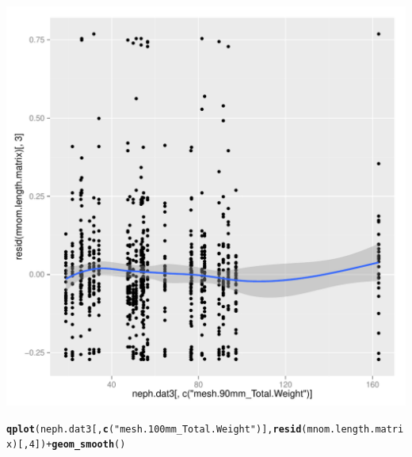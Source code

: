 \documentclass[12pt]{article}\usepackage[]{graphicx}\usepackage[]{color}
\makeatletter
\def\maxwidth{ %
  \ifdim\Gin@nat@width>\linewidth
    \linewidth
  \else
    \Gin@nat@width
  \fi
}
\newcommand{\hlnum}[1]{\textcolor[rgb]{0.686,0.059,0.569}{#1}}%
\newcommand{\hlstr}[1]{\textcolor[rgb]{0.192,0.494,0.8}{#1}}%
\newcommand{\hlopt}[1]{\textcolor[rgb]{0,0,0}{#1}}%
\newcommand{\hlstd}[1]{\textcolor[rgb]{0.345,0.345,0.345}{#1}}%
\newcommand{\hlkwd}[1]{\textcolor[rgb]{0.737,0.353,0.396}{\textbf{#1}}}%
\newenvironment{kframe}{%
 \def\at@end@of@kframe{}%
 \ifinner\ifhmode%
  \def\at@end@of@kframe{\end{minipage}}%
  \begin{minipage}{\columnwidth}%
 \fi\fi%
 \def\FrameCommand##1{\hskip\@totalleftmargin \hskip-\fboxsep
 \colorbox{shadecolor}{##1}\hskip-\fboxsep
     \hskip-\linewidth \hskip-\@totalleftmargin \hskip\columnwidth}%
 \MakeFramed {\advance\hsize-\width
   \@totalleftmargin\z@ \linewidth\hsize
   \@setminipage}}%
 {\par\unskip\endMakeFramed%
 \at@end@of@kframe}
\newenvironment{knitrout}{}{} %
\makeatother
\begin{document}
\begin{knitrout}
\begin{kframe}
{\ttfamily\noindent\itshape{}}\end{kframe}
\includegraphics[width=\maxwidth]{figure/unnamed-chunk-9-4} 
\begin{kframe}\begin{alltt}
\hlkwd{qplot}\hlstd{(neph.dat3[,} \hlkwd{c}\hlstd{(}\hlstr{"mesh.100mm_Total.Weight"}\hlstd{)],} \hlkwd{resid}\hlstd{(mnom.length.matrix)[,}\hlnum{4}\hlstd{])} \hlopt{+} \hlkwd{geom_smooth}\hlstd{()}
\end{alltt}



\end{kframe}
\end{knitrout}
\end{document}
